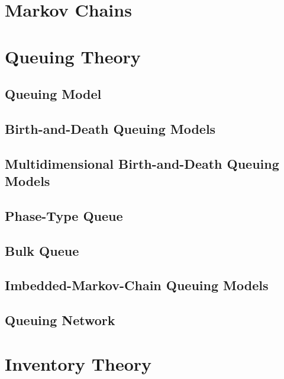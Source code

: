 \part{Markov Chains}

\part{Queuing Theory}
	\chapter{Queuing Model}

	\chapter{Birth-and-Death Queuing Models}

	\chapter{Multidimensional Birth-and-Death Queuing Models}

	\chapter{Phase-Type Queue}

	\chapter{Bulk Queue}

	\chapter{Imbedded-Markov-Chain Queuing Models}

	\chapter{Queuing Network}

\part{Inventory Theory}